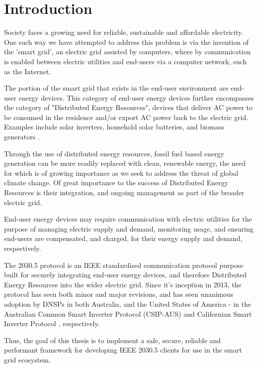 \chapter{Introduction}\label{ch:intro}
Society faces a growing need for reliable, sustainable and affordable electricity. One such way we have attempted to address this problem is via the invention of the 'smart grid', an electric grid assisted by computers, where by communication is enabled between electric utilities and end-users via a computer network, such as the Internet.

The portion of the smart grid that exists in the end-user environment are end-user energy devices.
This category of end-user energy devices further encompasses the category of "Distributed Energy Resources", devices that deliver AC power to be consumed in the residence and/or export AC power back to the electric grid. Examples include solar inverters, household solar batteries, and biomass generators \cite{IEEE2030.5}. 

Through the use of distributed energy resources, fossil fuel based energy generation can be more readily replaced with clean, renewable energy, the need for which is of growing importance as we seek to address the threat of global climate change. Of great importance to the success of Distributed Energy Resources is their integration, and ongoing management as part of the broader electric grid.

End-user energy devices may require communication with electric utilities for the purpose of managing electric supply and demand, monitoring usage, and ensuring end-users are compensated, and charged, for their energy supply and demand, respectively.

The 2030.5 protocol is an IEEE standardised communication protocol purpose built for securely integrating end-user energy devices, and therefore Distributed Energy Resources into the wider electric grid. Since it's inception in 2013, the protocol has seen both minor and major revisions, and has seen unanimous adoption by DNSPs in both Australia, and the United States of America - in the Australian Common Smart Inverter Protocol (CSIP-AUS) \cite{CSIPAus} and Californian Smart Inverter Protocol \cite{CalAdoption}, respectively.

Thus, the goal of this thesis is to implement a safe, secure, reliable and performant framework for developing IEEE 2030.5 clients for use in the smart grid ecosystem. 
